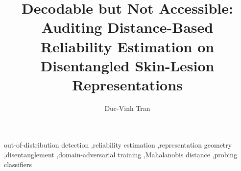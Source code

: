 
\begin{frontmatter}

\title{Decodable but Not Accessible: Auditing Distance-Based Reliability Estimation on Disentangled Skin-Lesion Representations}

\author[inst1]{Duc-Vinh Tran}

\address[inst1]{School of Information and Communication Technology, Hanoi University of Science and Technology, 1 Dai Co Viet Road, Hai Ba Trung, Hanoi 100000, Vietnam}


\begin{abstract}

\end{abstract}

\begin{keyword}
out-of-distribution detection \sep reliability estimation \sep representation geometry \sep disentanglement \sep domain-adversarial training \sep Mahalanobis distance \sep probing classifiers
\end{keyword}

\end{frontmatter}
